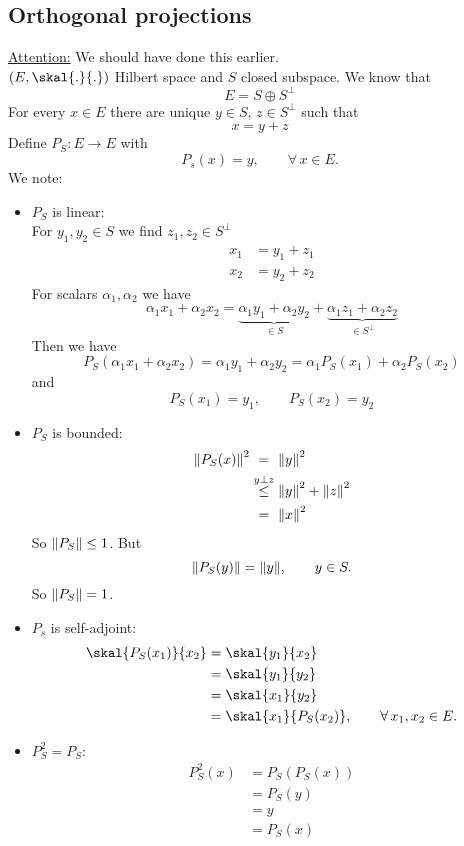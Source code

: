 \subsection{Orthogonal projections} 
\label{sub:orthogonal_projections}
\underline{Attention:} We should have done this earlier. \\
$(E, \skal{.}{.})$ Hilbert space and $S$ closed subspace. We know that
\[
	E = S \oplus S^{\perp}
\]
For every $x \in E$ there are unique $y \in S$, $z \in S^{\perp}$ such that
\[
	x = y + z
\]
Define $P_S: E \to E$ with
\[
	P_s(x)= y, \qquad \forall\, x \in E.
\]
We note:
\begin{itemize}
	\item $P_S$ is linear: \\
	For $y_1,y_2 \in S$ we find $z_1,z_2 \in S^{\perp}$
	\begin{align*}
		x_1 &= y_1 + z_1 \\
		x_2 &= y_2 + z_2
	\end{align*}
	For scalars $\alpha_1,\alpha_2$ we have
	\[
		\alpha_1 x_1 + \alpha_2 x_2 = \underset{\in S}{\underbrace{\alpha_1 y_1 + \alpha_2 y_2}} + \underset{\in S^{\perp}}{\underbrace{\alpha_1 z_1 + \alpha_2 z_2}}
	\]
	Then we have
	\[
		P_S(\alpha_1 x_1 + \alpha_2 x_2) = \alpha_1 y_1 + \alpha_2 y_2 = \alpha_1 P_S(x_1) + \alpha_2 P_S(x_2)
	\]
	and
	\[
		P_S(x_1) =y_1, \qquad P_S(x_2)=y_2
	\]
	\item $P_S$ is bounded: \\
	\begin{align*}
		\norm{P_S(x)}^2 & \stackrel{\hphantom{y \perp z}}{=} \norm{y}^2 \\
		& \stackrel{y \perp z}{\leq } \norm{y}^2 + \norm{z}^2 \\
		& \stackrel{\hphantom{y \perp z}}{=} \norm{x}^2
	\end{align*}
	So $\norm{P_S} \leq 1$. But
	\[
		\norm{P_S(y)} = \norm{y}, \qquad y \in S.
	\]
	So $\norm{P_S}=1$.
	\item $P_s$ is self-adjoint: \\
	\begin{align*}
		\skal{P_S(x_1)}{x_2} &= \skal{y_1}{x_2} \\
		&= \skal{y_1}{y_2} \\
		&= \skal{x_1}{y_2} \\
		&= \skal{x_1}{P_S(x_2)}, \qquad \forall\, x_1,x_2 \in E.
	\end{align*}
	\item $P_S^2=P_S$:
	\begin{align*}
		P_S^2(x) &= P_S(P_S(x)) \\
		&= P_S(y) \\
		&= y \\
		&= P_S(x)
	\end{align*}
\end{itemize}
 

